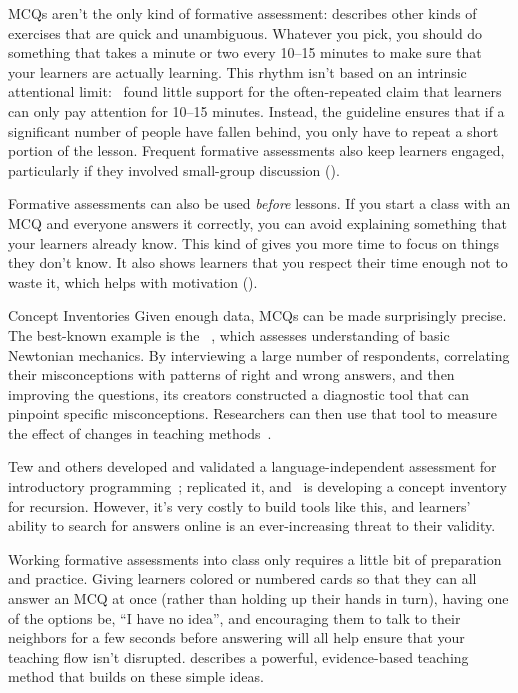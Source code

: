 MCQs aren't the only kind of formative assessment:
 describes other kinds of exercises that are quick and unambiguous.
Whatever you pick,
you should do something that takes a minute or two every 10--15 minutes
to make sure that your learners are actually learning.
This rhythm isn't based on an intrinsic attentional limit:~\cite{Wils2007}
found little support for the often-repeated claim that
learners can only pay attention for 10--15 minutes.
Instead,
the guideline ensures that if a significant number of people have fallen behind,
you only have to repeat a short portion of the lesson.
Frequent formative assessments also keep learners engaged,
particularly if they involved small-group discussion
().

Formative assessments can also be used \emph{before} lessons.
If you start a class with an MCQ and everyone answers it correctly,
you can avoid explaining something that your learners already know.
This kind of 
gives you more time to focus on things they don't know.
It also shows learners that you respect their time enough not to waste it,
which helps with motivation ().

\begin{aside}{Concept Inventories}
  Given enough data,
  MCQs can be made surprisingly precise.
  The best-known example is the
  ~\cite{Hest1992},
  which assesses understanding of basic Newtonian mechanics.
  By interviewing a large number of respondents,
  correlating their misconceptions with patterns of right and wrong answers,
  and then improving the questions,
  its creators constructed a diagnostic tool that can pinpoint specific misconceptions.
  Researchers can then use that tool to measure the effect of changes in teaching methods~\cite{Hake1998}.

  Tew and others developed and validated
  a language-independent assessment for introductory programming~\cite{Tew2011};
  \cite{Park2016} replicated it,
  and~\cite{Hamo2017} is developing a concept inventory for recursion.
  However,
  it's very costly to build tools like this,
  and learners' ability to search for answers online is an ever-increasing threat to their validity.
\end{aside}

Working formative assessments into class only requires a little bit of preparation and practice.
Giving learners colored or numbered cards so that they can all answer an MCQ at once
(rather than holding up their hands in turn),
having one of the options be, ``I have no idea'',
and encouraging them to talk to their neighbors for a few seconds before answering
will all help ensure that your teaching flow isn't disrupted.
 describes a powerful,
evidence-based teaching method that builds on these simple ideas.

